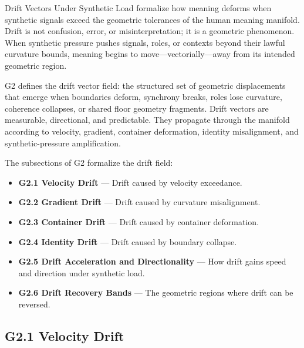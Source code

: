 
\medskip

\noindent Drift Vectors Under Synthetic Load formalize how meaning deforms when
synthetic signals exceed the geometric tolerances of the human meaning
manifold. Drift is not confusion, error, or misinterpretation; it is a geometric
phenomenon. When synthetic pressure pushes signals, roles, or contexts beyond
their lawful curvature bounds, meaning begins to move—vectorially—away from its
intended geometric region.

\medskip

\noindent G2 defines the drift vector field: the structured set of geometric
displacements that emerge when boundaries deform, synchrony breaks, roles lose
curvature, coherence collapses, or shared floor geometry fragments. Drift
vectors are measurable, directional, and predictable. They propagate through the
manifold according to velocity, gradient, container deformation, identity
misalignment, and synthetic-pressure amplification.

\medskip

\noindent The subsections of G2 formalize the drift field:

\begin{itemize}[leftmargin=1.2cm]
    \item \textbf{G2.1 Velocity Drift} — Drift caused by velocity exceedance.
    \item \textbf{G2.2 Gradient Drift} — Drift caused by curvature misalignment.
    \item \textbf{G2.3 Container Drift} — Drift caused by container deformation.
    \item \textbf{G2.4 Identity Drift} — Drift caused by boundary collapse.
    \item \textbf{G2.5 Drift Acceleration and Directionality} — How drift gains
    speed and direction under synthetic load.
    \item \textbf{G2.6 Drift Recovery Bands} — The geometric regions where drift
    can be reversed.
\end{itemize}

\medskip

\subsection*{G2.1 Velocity Drift}

